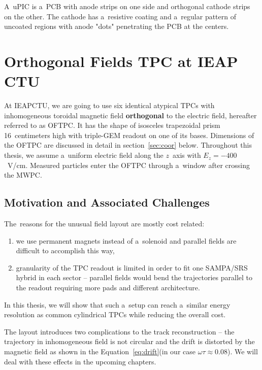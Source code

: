 				A~\ac{uPIC} is a~\ac{PCB} with anode strips on one side and orthogonal cathode strips on the other. The cathode has a~resistive coating and a~regular pattern of uncoated regions with anode "dots" penetrating the \ac{PCB} at the centers.
	
	\section{Orthogonal Fields TPC at IEAP CTU}
	\label{sec:oftpc}
		At \ac{IEAPCTU}, we are going to use six identical atypical \acp{TPC} with inhomogeneous toroidal magnetic field \textbf{orthogonal} to the electric field, hereafter referred to as \acf{OFTPC}. It has the shape of isosceles trapezoidal prism 16~centimeters high with triple\nobreakdash-\ac{GEM} readout on one of its bases. Dimensions of the \ac{OFTPC} are discussed in detail in section~\ref{sec:coor} below. Throughout this thesis, we assume a~uniform electric field along the $z$~axis with $E_z = -400$~V/cm. Measured particles enter the \ac{OFTPC} through a~window after crossing the \ac{MWPC}.
		
		
		\subsection{Motivation and Associated Challenges}
			The~reasons for the unusual field layout are mostly cost related:
				\begin{enumerate}[nosep,label=\alph*)]
					\item we use permanent magnets instead of a~solenoid and parallel fields are difficult to accomplish this way,
					\item granularity of the \ac{TPC} readout is limited in order to fit one SAMPA/SRS hybrid in each sector -- parallel fields would bend the trajectories parallel to the readout requiring more pads and different architecture.
				\end{enumerate}
			In this thesis, we will show that such a~setup can reach a~similar energy resolution as common cylindrical \acp{TPC} while reducing the overall cost.
			
			The layout introduces two complications to the track reconstruction -- the trajectory in inhomogeneous field is not circular and the drift is distorted by the magnetic field as shown in the Equation~\ref{eq:drift}(in our case $\omega\tau \approx 0.08$). We will deal with these effects in the upcoming chapters.
			

